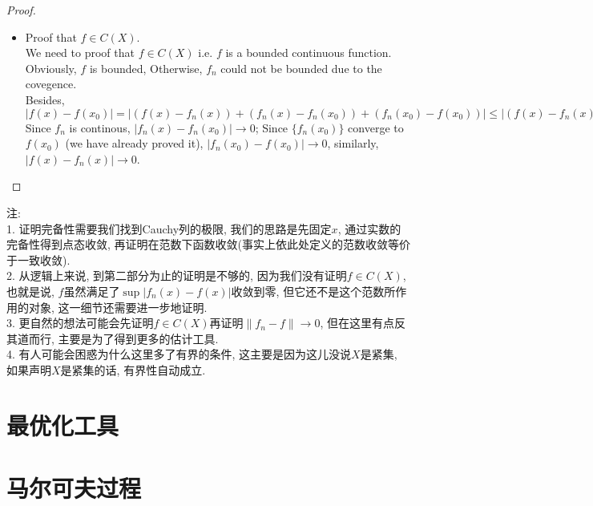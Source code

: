 \begin{proof}
\begin{itemize}
        \item Proof that $f\in C(X)$.\\
        We need to proof that $f\in C(X)$ i.e. $f$ is a bounded continuous function.\\
        Obviously, $f$ is bounded, Otherwise, $f_n$ could not be bounded due to  the covegence.\\
        Besides, $|f(x)-f(x_0)|=|(f(x)-f_n(x))+(f_n(x)-f_n(x_0))+(f_n(x_0)-f(x_0))|\leq |(f(x)-f_n(x))|+|(f_n(x)-f_n(x_0))|+|(f_n(x_0)-f(x_0))|$\\
        Since $f_n$ is continous, $|f_n(x)-f_n(x_0)|\to 0$; Since $\{f_n(x_0)\}$ converge to $f(x_0)$ (we have already proved it), $|f_n(x_0)-f(x_0)|\to 0$, similarly, $|f(x)-f_n(x)|\to 0$.

    \end{itemize}
\end{proof}
\noindent 注:\\
1. 证明完备性需要我们找到Cauchy列的极限, 我们的思路是先固定$x$, 通过实数的完备性得到点态收敛, 再证明在范数下函数收敛(事实上依此处定义的范数收敛等价于一致收敛).\\
2. 从逻辑上来说, 到第二部分为止的证明是不够的, 因为我们没有证明$f\in C(X)$, 也就是说, $f$虽然满足了$\sup |f_n(x)-f(x)|$收敛到零, 但它还不是这个范数所作用的对象, 这一细节还需要进一步地证明.\\
3. 更自然的想法可能会先证明$f\in C(X)$再证明$\|f_n-f\|\to 0 $, 但在这里有点反其道而行, 主要是为了得到更多的估计工具.\\
4. 有人可能会困惑为什么这里多了有界的条件, 这主要是因为这儿没说$X$是紧集, 如果声明$X$是紧集的话, 有界性自动成立.
\section{最优化工具}
\section{马尔可夫过程}
